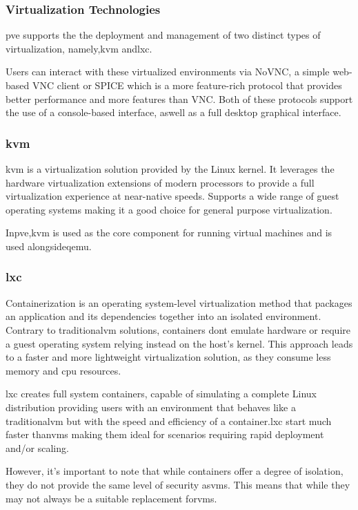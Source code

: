     \subsubsection{Virtualization Technologies}
      \ac{pve} supports the the deployment and management of two distinct types of virtualization, namely,\ac{kvm} and\ac{lxc}.

      Users can interact with these virtualized environments via NoVNC, a simple web-based VNC client or SPICE which is a more
      feature-rich protocol that provides better performance and more features than VNC.
      Both of these protocols support the use of a console-based interface, aswell as a full desktop graphical interface.

      \subsubsection{\ac{kvm}}
        \ac{kvm} is a virtualization solution provided by the Linux kernel. It leverages the hardware virtualization extensions 
        of modern processors to provide a full virtualization experience at near-native speeds. Supports a wide range of guest 
        operating systems making it a good choice for general purpose virtualization.

        In\ac{pve},\ac{kvm} is used as the core component for running virtual machines and is used alongside\ac{qemu}.

      \subsubsection{\ac{lxc}}
        Containerization is an operating system-level virtualization method that packages an application and its dependencies
        together into an isolated environment. Contrary to traditional\ac{vm} solutions, containers dont emulate hardware or require a 
        guest operating system relying instead on the host's kernel. This approach leads to a faster and more lightweight 
        virtualization solution, as they consume less memory and cpu resources.

        \ac{lxc} creates full system containers, capable of simulating a complete Linux distribution providing users with an 
        environment that behaves like a traditional\ac{vm} but with the speed and efficiency of a container.\ac{lxc} start 
        much faster than\ac{vm}s making them ideal for scenarios requiring rapid deployment and/or scaling.

        However, it's important to note that while containers offer a degree of isolation, they do not provide the same level of
        security as\ac{vm}s. This means that while they may not always be a suitable replacement for\ac{vm}s.

